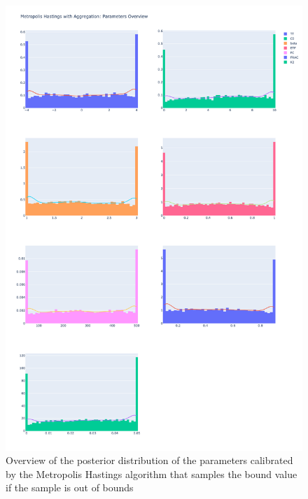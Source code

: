 \begin{figure}
    \centering
    \includegraphics[width=1\textwidth]{figures/basic_mh/aggr_mh/aggr_mh_parameters_overview.png}
    \captionsetup{width=.8\textwidth}
    \caption{Overview of the posterior distribution of the parameters calibrated by the Metropolis Hastings algorithm that samples the bound value if the sample is out of bounds}
    \label{fig:enter-label}
\end{figure}

